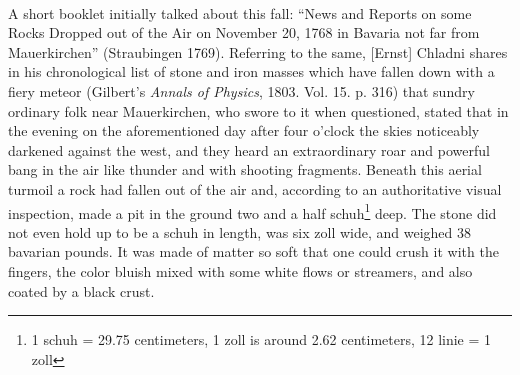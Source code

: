 \documentclass[a4paper, 12pt, oneside]{article}
\begin{document}
\paragraph{}
A short booklet initially talked about this fall: ``News and Reports on some Rocks Dropped out of the Air on November 20, 1768 in Bavaria not far from Mauerkirchen'' (Straubingen 1769). Referring to the same, [Ernst] Chladni shares in his chronological list of stone and iron masses which have fallen down with a fiery meteor (Gilbert's \emph{Annals of Physics}, 1803. Vol. 15. p. 316) that sundry ordinary folk near Mauerkirchen, who swore to it when questioned, stated that in the evening on the aforementioned day after four o'clock the skies noticeably darkened against the west, and they heard an extraordinary roar and powerful bang in the air like thunder and with shooting fragments. Beneath this aerial turmoil a rock had fallen out of the air and, according to an authoritative visual inspection, made a pit in the ground two and a half schuh\footnote{1 schuh = 29.75 centimeters, 1 zoll is around 2.62 centimeters, 12 linie = 1 zoll} deep. The stone did not even hold up to be a schuh in length, was six zoll wide, and weighed 38 bavarian pounds. It was made of matter so soft that one could crush it with the fingers, the color bluish mixed with some white flows or streamers, and also coated by a black crust.
\end{document}
